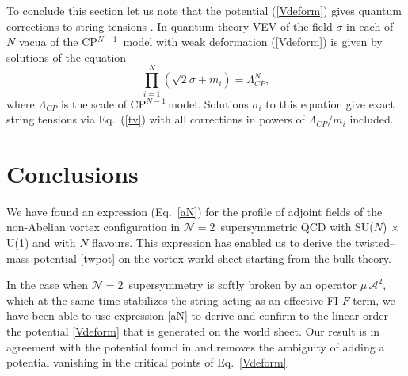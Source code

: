 \documentclass[12pt]{article}
\def\beq{\begin{equation}}
\def\eeq{\end{equation}}
\newcommand{\ntwon}{${\mathcal N}=2$}
\newcommand{\ma}{\mathcal{A}}
\newcommand{\sunu}{{\rm SU($N$) $\times$ U(1) }}
\newcommand{\cpn}{CP$^{N-1}$\,}
\begin{document}
To conclude this section let us note that the potential 
(\ref{Vdeform}) gives quantum corrections to string tensions
\cite{Shifman:2010kr}.
In quantum theory VEV of the field $\sigma$ in each of $N$ vacua of the \cpn
model with weak deformation (\ref{Vdeform}) is given by
solutions of the equation \cite{AdDVecSal,ChVa,W93,HaHo}
\beq
\prod_{i=1}^{N}(\sqrt{2}\sigma +m_i)=\Lambda_{CP}^N,
\eeq
where $\Lambda_{CP}$ is the scale of \cpn model. Solutions $\sigma_i$ to this equation  give exact string tensions
via Eq.~(\ref{tv}) with all corrections 
in powers of $\Lambda_{CP}/m_i$ included.

\section{Conclusions}

	We have found an expression (Eq.~\eqref{aN}) for the profile of adjoint fields 
	of the non-Abelian vortex configuration in \ntwon\, supersymmetric QCD 
	with \sunu and with $ N $ flavours.
	This expression has enabled us to derive the twisted--mass potential \eqref{twpot} on the 
	vortex world sheet starting from the bulk theory.

	In the case when \ntwon\, supersymmetry is softly broken by an operator $ \mu\, \ma^2 $, 
	which at the same time stabilizes the string acting as an effective FI $ F $-term,
	we have been able to use expression \eqref{aN} to derive and confirm to the linear order
	the potential \eqref{Vdeform} that is generated on the world sheet.
	Our result is in agreement with the potential found in \cite{Shifman:2010kr}
	and removes the ambiguity of adding a potential vanishing in the critical points of Eq.~\eqref{Vdeform}.




\end{document}
